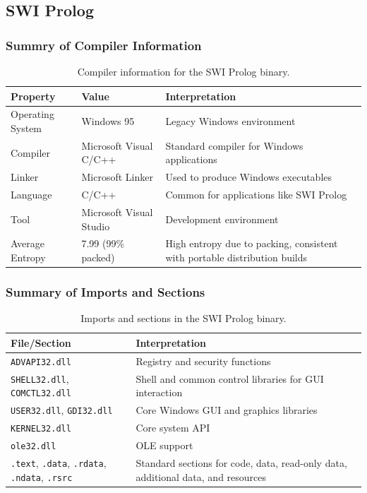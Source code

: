 \documentclass{article}
\begin{document}
\subsection{SWI Prolog}
\subsubsection{Summry of Compiler Information}
\begin{table}[H]
  \centering
  \begin{tabular}{|p{3cm}|p{3cm}|p{6cm}|}
    \hline
    \textbf{Property} & \textbf{Value} & \textbf{Interpretation} \\
    \hline
    Operating System & Windows 95 & Legacy Windows environment \\
    \hline
    Compiler & Microsoft Visual C/C++ & Standard compiler for Windows applications \\
    \hline
    Linker & Microsoft Linker & Used to produce Windows executables \\
    \hline
    Language & C/C++ & Common for applications like SWI Prolog \\
    \hline
    Tool & Microsoft Visual Studio & Development environment \\
    \hline
    Average Entropy & 7.99 (99\% packed) & High entropy due to packing, consistent with portable distribution builds \\
    \hline
  \end{tabular}
  \caption{Compiler information for the SWI Prolog binary.}
  \label{tab:prolog-compiler}
\end{table}

\subsubsection{Summary of Imports and Sections}
\begin{table}[H]
  \centering
  \begin{tabular}{|p{4cm}|p{8cm}|}
    \hline
    \textbf{File/Section} & \textbf{Interpretation} \\
    \hline
    \texttt{ADVAPI32.dll} & Registry and security functions \\
    \hline
    \texttt{SHELL32.dll}, \texttt{COMCTL32.dll} & Shell and common control libraries for GUI interaction \\
    \hline
    \texttt{USER32.dll}, \texttt{GDI32.dll} & Core Windows GUI and graphics libraries \\
    \hline
    \texttt{KERNEL32.dll} & Core system API \\
    \hline
    \texttt{ole32.dll} & OLE support \\
    \hline
    \texttt{.text}, \texttt{.data}, \texttt{.rdata}, \texttt{.ndata}, \texttt{.rsrc} & Standard sections for code, data, read-only data, additional data, and resources \\
    \hline
  \end{tabular}
  \caption{Imports and sections in the SWI Prolog binary.}
  \label{tab:gimp-imports}
\end{table}
\end{document}
